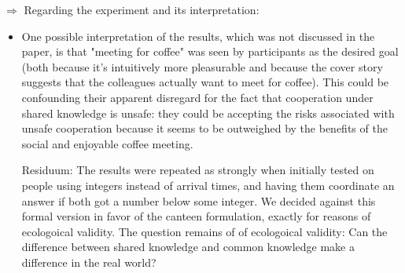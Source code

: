 \documentclass[a4paper]{article}
\newenvironment{robin}{\smallskip \noindent \color{red!10!green!50!blue}}{\color{black}\smallskip}
\begin{document}
$\Rightarrow$ Regarding the experiment and its interpretation:
\begin{itemize}
  \item One possible interpretation of the results, which was not discussed in the paper, is that "meeting for coffee" was seen by participants as the desired goal (both because it's intuitively more pleasurable and because the cover story suggests that the colleagues actually want to meet for coffee). This could be confounding their apparent disregard for the fact that cooperation under shared knowledge is unsafe: they could be accepting the risks associated with unsafe cooperation because it seems to be outweighed by the benefits of the social and enjoyable coffee meeting. 

\begin{robin}
Residuum: The results were repeated as strongly when initially tested on people using integers instead of arrival times, and having them coordinate an answer if both got a number below some integer. We decided against this formal version in favor of the canteen formulation, exactly for reasons of ecologoical validity. The question remains of of ecologoical validity: Can the difference between shared knowledge and common knowledge make a difference in the real world? 


\end{robin}
\end{itemize}
\end{document}
